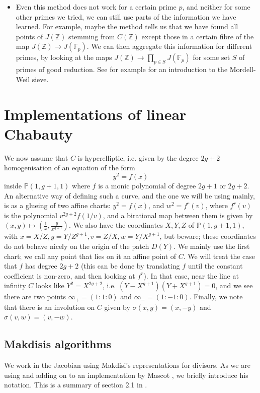 \documentclass[12pt]{article}
\newcommand{\Z}{\mathbb{Z}}
\renewcommand{\P}{\mathbb{P}}
\newcommand{\F}{\mathbb{F}}
\theoremstyle{plain}
\theoremstyle{definition}
\theoremstyle{remark}
\begin{document}
\begin{itemize}
\item Even this method does not work for a certain prime $p$, and neither for some other primes we tried, we can still use parts of the information we have learned. For example, maybe the method tells us that we have found all points of $J(\Z)$ stemming from $C(\Z)$ except those in a certain fibre of the map $J(\Z) \to J(\F_p)$. We can then aggregate this information for different primes, by looking at the maps $J(\Z) \to \prod_{p \in S} J(\F_p)$ for some set $S$ of primes of good reduction. See for example \cite{stoll10} for an introduction to the Mordell-Weil sieve.
\end{itemize}

\section{Implementations of linear Chabauty}
\label{section:explicit}
We now assume that $C$ is hyperelliptic, i.e. given by the degree $2g+2$ homogenisation of an equation of the form
\[
y^2 = f(x)
\]
inside $\P(1,g+1,1)$ where $f$ is a monic polynomial of degree $2g+1$ or $2g+2$. An alternative way of defining such a curve, and the one we will be using mainly, is as a glueing of two affine charts: $y^2 = f(x)$, and $w^2 = f^{r}(v)$, where $f^{r}(v)$ is the polynomial $v^{2g + 2} f(1/v)$, and a birational map between them is given by $(x,y) \mapsto (\frac{1}{x},\frac{y}{x^{g+1}})$. We also have the coordinates $X,Y,Z$ of $\P(1,g+1,1)$, with $x = X/Z, y = Y/Z^{g+1}, v = Z/X, w = Y/X^{g+1}$, but beware; these coordinates do not behave nicely on the origin of the patch $D(Y)$. We mainly use the first chart; we call any point that lies on it an affine point of $C$. We will treat the case that $f$ has degree $2g+2$ (this can be done by translating $f$ until the constant coefficient is non-zero, and then looking at $f^r$). In that case, near the line at infinity $C$ looks like $Y^2 = X^{2g+2}$, i.e. $(Y-X^{g+1})(Y+X^{g+1}) = 0$, and we see there are two points $\infty_+ = (1:1:0)$ and $\infty_- = (1:-1:0)$. Finally, we note that there is an involution on $C$ given by $\sigma(x,y) = (x,-y)$ and $\sigma(v,w) = (v,-w)$.

\subsection{Makdisis algorithms}
We work in the Jacobian using Makdisi's representations for divisors. As we are using and adding on to an implementation by Mascot \cite{mascot18}, we briefly introduce his notation. This is a summary of section 2.1 in \cite{mascot18}.
\end{document}
